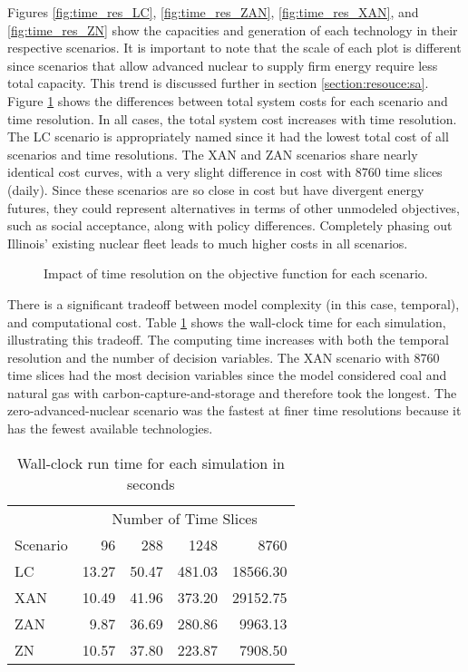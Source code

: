Figures \ref{fig:time_res_LC}, \ref{fig:time_res_ZAN}, \ref{fig:time_res_XAN},
and \ref{fig:time_res_ZN}
show the capacities and generation of each technology in their respective scenarios.
It is important to note that the scale of each plot is different since scenarios
that allow advanced nuclear to supply firm energy require less total capacity.
This trend is discussed further in section \ref{section:resouce:sa}.
Figure \ref{fig:time_res_cost} shows the differences between total system costs
for each scenario and time resolution.
In all cases, the total system cost increases with time resolution. The \gls{LC}
scenario is appropriately named since it had the lowest total cost
of all scenarios and time resolutions. The \gls{XAN} and \gls{ZAN} scenarios share
nearly identical cost curves,
with a very slight difference in cost with 8760 time slices (daily). Since these
scenarios are so close in cost but have divergent energy futures, they could represent
alternatives in terms of other unmodeled objectives, such as social acceptance,
along with policy differences. Completely phasing out Illinois' existing nuclear
fleet leads to much higher costs in all scenarios.

\begin{figure}[H]
  \centering
  \resizebox{0.75\columnwidth}{!}{}
  \caption{Impact of time resolution on the objective function for each scenario.}
  \label{fig:time_res_cost}
\end{figure}



There is a significant tradeoff between model complexity (in this case, temporal),
and computational cost. Table \ref{tab:time_res_clock} shows the
wall-clock time for each simulation, illustrating this tradeoff.
The computing time increases with both the temporal resolution and the number of
decision variables. The \gls{XAN} scenario with 8760 time slices had the most decision
variables since the model considered coal and natural gas with
carbon-capture-and-storage and therefore took the longest. The zero-advanced-nuclear
scenario was the fastest at finer time resolutions because it has the fewest
available technologies.

\begin{table}[H]
  \centering
  \caption{Wall-clock run time for each simulation in seconds}
  \label{tab:time_res_clock}
  \begin{tabular}{l*{4}{r}}
    \toprule
    & \multicolumn{4}{c}{Number of Time Slices}\\
    Scenario & 96 & 288 & 1248&8760\\
    \midrule
    LC &13.27&50.47&481.03&18566.30\\
    XAN &10.49&41.96&373.20&29152.75\\
    ZAN &9.87&36.69&280.86&9963.13\\
    ZN & 10.57&37.80&223.87&7908.50\\
    \bottomrule
  \end{tabular}
\end{table}


